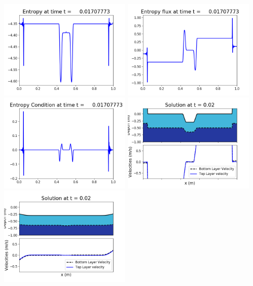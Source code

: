 \documentclass[11pt]{article}
\begin{document}
\vskip 10pt 
\includegraphics[width=0.475\textwidth]{frame0040fig1007.png}
\includegraphics[width=0.475\textwidth]{frame0040fig1008.png}
\vskip 10pt 
\includegraphics[width=0.475\textwidth]{frame0040fig1009.png}
\vskip 10pt 
\includegraphics[width=0.475\textwidth]{frame0041fig1001.png}
\includegraphics[width=0.475\textwidth]{frame0041fig1002.png}
\end{document}
